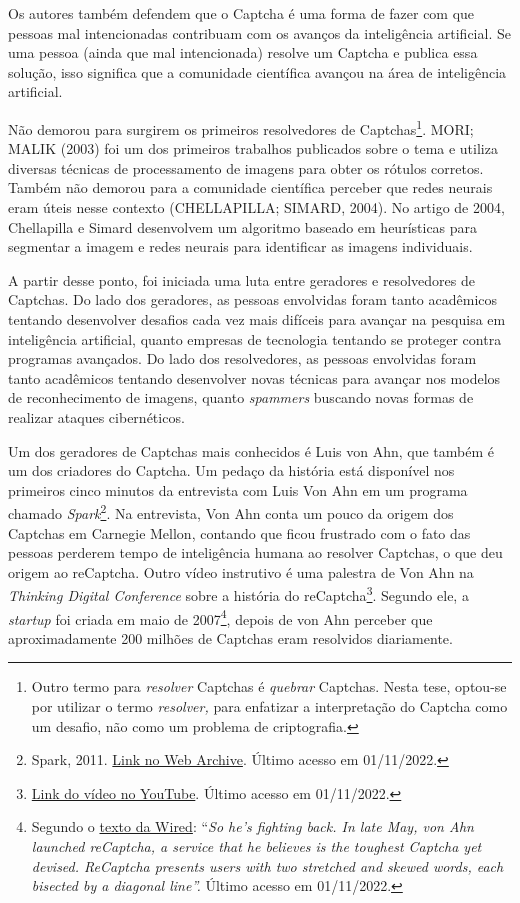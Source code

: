\documentclass[12pt,twoside,brazilian]{book}
\begin{document}
Os autores também defendem que o Captcha é uma forma de fazer com que
pessoas mal intencionadas contribuam com os avanços da inteligência
artificial. Se uma pessoa (ainda que mal intencionada) resolve um
Captcha e publica essa solução, isso significa que a comunidade
científica avançou na área de inteligência artificial.

Não demorou para surgirem os primeiros resolvedores de
Captchas\footnote{Outro termo para \emph{resolver} Captchas é
  \emph{quebrar} Captchas. Nesta tese, optou-se por utilizar o termo
  \emph{resolver,} para enfatizar a interpretação do Captcha como um
  desafio, não como um problema de criptografia.}. MORI; MALIK (2003)
foi um dos primeiros trabalhos publicados sobre o tema e utiliza
diversas técnicas de processamento de imagens para obter os rótulos
corretos. Também não demorou para a comunidade científica perceber que
redes neurais eram úteis nesse contexto (CHELLAPILLA; SIMARD, 2004). No
artigo de 2004, Chellapilla e Simard desenvolvem um algoritmo baseado em
heurísticas para segmentar a imagem e redes neurais para identificar as
imagens individuais.

A partir desse ponto, foi iniciada uma luta entre geradores e
resolvedores de Captchas. Do lado dos geradores, as pessoas envolvidas
foram tanto acadêmicos tentando desenvolver desafios cada vez mais
difíceis para avançar na pesquisa em inteligência artificial, quanto
empresas de tecnologia tentando se proteger contra programas avançados.
Do lado dos resolvedores, as pessoas envolvidas foram tanto acadêmicos
tentando desenvolver novas técnicas para avançar nos modelos de
reconhecimento de imagens, quanto \emph{spammers} buscando novas formas
de realizar ataques cibernéticos.

Um dos geradores de Captchas mais conhecidos é Luis von Ahn, que também
é um dos criadores do Captcha. Um pedaço da história está disponível nos
primeiros cinco minutos da entrevista com Luis Von Ahn em um programa
chamado \emph{Spark}\footnote{Spark, 2011.
  \href{https://web.archive.org/web/20120603142110/http://www.cbc.ca/spark/2011/11/full-interview-luis-von-ahn-on-duolingo/}{Link
  no Web Archive}. Último acesso em 01/11/2022.}. Na entrevista, Von Ahn
conta um pouco da origem dos Captchas em Carnegie Mellon, contando que
ficou frustrado com o fato das pessoas perderem tempo de inteligência
humana ao resolver Captchas, o que deu origem ao reCaptcha. Outro vídeo
instrutivo é uma palestra de Von Ahn na \emph{Thinking Digital
Conference} sobre a história do reCaptcha\footnote{\href{https://www.youtube.com/watch?v=i_5ew4btJiQ}{Link
  do vídeo no YouTube}. Último acesso em 01/11/2022.}. Segundo ele, a
\emph{startup} foi criada em maio de 2007\footnote{Segundo o
  \href{https://www.wired.com/2007/06/ff-humancomp/}{texto da Wired}:
  ``\emph{So he's fighting back. In late May, von Ahn launched
  reCaptcha, a service that he believes is the toughest Captcha yet
  devised. ReCaptcha presents users with two stretched and skewed words,
  each bisected by a diagonal line''.} Último acesso em 01/11/2022.},
depois de von Ahn perceber que aproximadamente 200 milhões de Captchas
eram resolvidos diariamente.
\end{document}
